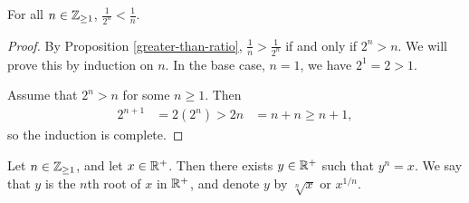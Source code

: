 \begin{lemma}\label{harmonic-vs-powers-of-two}
    For all $n \in \mathbb{Z}_{\geq 1}$, $\frac{1}{2^n} < \frac{1}{n}.$
\end{lemma}

\begin{proof}
    By Proposition \ref{greater-than-ratio}, $\frac{1}{n} > \frac{1}{2^n}$ if and only if $2^n > n$. We will prove this by induction on $n$. In the base case, $n=1$, we have $2^1 = 2 > 1$.

    Assume that $2^n > n$ for some $n \geq 1$. Then
    \begin{align*}
        2^{n+1} &= 2(2^n) > 2n
        &= n + n \geq n + 1,
    \end{align*}
    so the induction is complete.
\end{proof}

\begin{thm}
    Let $n \in \mathbb{Z}_{\geq 1}$, and let $x \in \mathbb{R}^+$. Then there exists $y \in \mathbb{R}^+$ such that $y^n = x$. We say that $y$ is the $n$th root of $x$ in $\mathbb{R}^+$, and denote $y$ by $\sqrt[n]{x}$ or $x^{1/n}$.
\end{thm}

